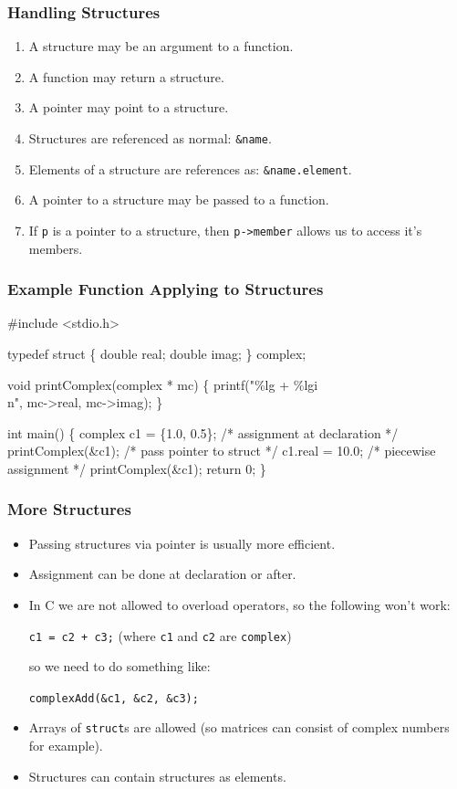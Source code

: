 \documentclass[table]{beamer}
\newif\ifschigh\schighfalse
\newcommand{\kw}[1]{\ifschigh\textcolor{red}{#1}\else\textcolor{keyword}{#1}\fi}
\newcommand{\kt}[1]{\ifschigh\textcolor{red}{#1}\else\textcolor{ctext}{#1}\fi}
\newcommand{\kc}[1]{\ifschigh\textcolor{red}{#1}\else\textcolor{comment}{#1}\fi}
\newcounter{sckll}
\newcommand{\kr}{\setcounter{sckll}{1}}
\newcommand{\kl}{}
\begin{document}
\begin{frame}
\frametitle{Handling Structures}
\begin{enumerate}
\item A structure may be an argument to a function.
\item A function may return a structure.
\item A pointer may point to a structure.
\item Structures are referenced as normal: {\tt \&name}.
\item Elements of a structure are references as: {\tt \&name.element}.
\item A pointer to a structure may be passed to a function.
\item If {\tt p} is a pointer to a structure, then {\tt p->member} allows us to access it's members.
\end{enumerate}
\end{frame}

\begin{frame}[fragile]
\frametitle{Example Function Applying to Structures}
\vspace{-0.2in}
\begin{semiverbatim}
\scriptsize
\kr\kl\kw{\#include} \kt{<stdio.h>}
\kl
\kl\kw{typedef struct}
\kl\{
\kl   \kw{double} real;
\kl   \kw{double} imag;
\kl\} complex;
\kl
\kl\kw{void} printComplex(complex * mc)
\kl\{
\kl   printf(\kt{"\%lg + \%lgi\\n"}, mc->real, mc->imag);
\kl\}
\kl
\kl\kw{int} main()
\kl\{
\kl   complex c1 = \{1.0, 0.5\}; \kc{/* assignment at declaration */}
\kl   printComplex(&c1);       \kc{/* pass pointer to struct */}
\kl   c1.real = 10.0;          \kc{/* piecewise assignment */}
\kl   printComplex(&c1);
\kl   \kw{return} 0;
\kl\}
\end{semiverbatim}
\end{frame}

\begin{frame}
\frametitle{More Structures}
\begin{itemize}
\item Passing structures via pointer is usually more efficient.
\item Assignment can be done at declaration or after.
\item In C we are not allowed to overload operators, so the following won't work:
\begin{center}
{\tt c1 = c2 + c3;} (where {\tt c1} and {\tt c2} are {\tt complex})
\end{center}
so we need to do something like:
\begin{center}
{\tt complexAdd(\&c1, \&c2, \&c3);}
\end{center}
\item Arrays of {\tt \kw{struct}}s are allowed (so matrices can consist of complex numbers for example).
\item Structures can contain structures as elements.
\end{itemize}
\end{frame}
\end{document}

